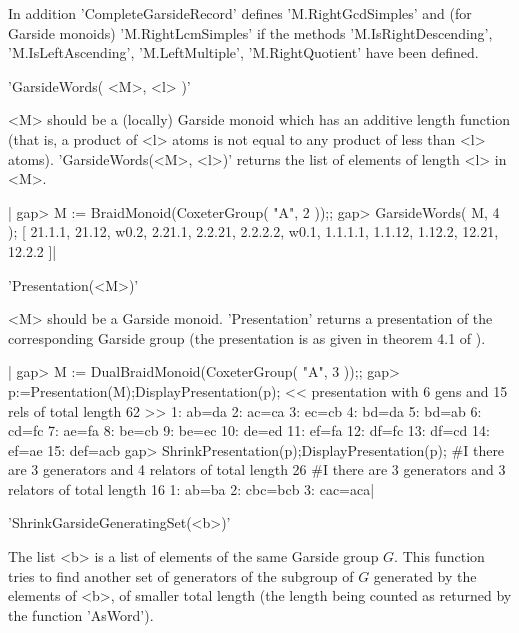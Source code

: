 In  addition 'CompleteGarsideRecord'  defines 'M.RightGcdSimples'  and (for
Garside  monoids) 'M.RightLcmSimples' if the methods 'M.IsRightDescending',
'M.IsLeftAscending', 'M.LeftMultiple', 'M.RightQuotient' have been defined.


'GarsideWords( <M>, <l> )'

<M>  should  be  a  (locally)  Garside  monoid which has an additive length
function  (that is, a product  of <l> atoms is  not equal to any product of
less than <l> atoms). 'GarsideWords(<M>, <l>)' returns the list of elements
of length <l> in <M>.

|    gap>  M := BraidMonoid(CoxeterGroup( "A", 2 ));;
    gap>  GarsideWords( M, 4 );
    [ 21.1.1, 21.12, w0.2, 2.21.1, 2.2.21, 2.2.2.2, w0.1, 1.1.1.1,
      1.1.12, 1.12.2, 12.21, 12.2.2 ]|


'Presentation(<M>)'

<M>  should be a  Garside monoid. 'Presentation'  returns a presentation of
the  corresponding Garside group  (the presentation is  as given in theorem
4.1 of \cite{DePa99}).

|    gap>  M := DualBraidMonoid(CoxeterGroup( "A", 3 ));;
    gap>  p:=Presentation(M);DisplayPresentation(p);
    << presentation with 6 gens and 15 rels of total length 62 >>
    1: ab=da
    2: ac=ca
    3: ec=cb
    4: bd=da
    5: bd=ab
    6: cd=fc
    7: ae=fa
    8: be=cb
    9: be=ec
    10: de=ed
    11: ef=fa
    12: df=fc
    13: df=cd
    14: ef=ae
    15: def=acb
    gap>  ShrinkPresentation(p);DisplayPresentation(p);
    #I  there are 3 generators and 4 relators of total length 26
    #I  there are 3 generators and 3 relators of total length 16
    1: ab=ba
    2: cbc=bcb
    3: cac=aca|


'ShrinkGarsideGeneratingSet(<b>)'

The  list <b>  is a  list of  elements of  the same Garside group $G$. This
function  tries to find  another set of  generators of the  subgroup of $G$
generated by the elements of <b>, of smaller total length (the length being
counted  as returned by the function  'AsWord').

